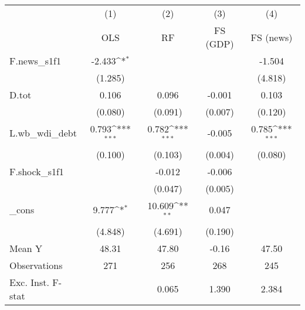 {
\def\sym#1{\ifmmode^{#1}\else\(^{#1}\)\fi}
\begin{tabular}{l*{4}{c}}
\toprule
            &\multicolumn{1}{c}{(1)}&\multicolumn{1}{c}{(2)}&\multicolumn{1}{c}{(3)}&\multicolumn{1}{c}{(4)}\\
            &\multicolumn{1}{c}{OLS}&\multicolumn{1}{c}{RF}&\multicolumn{1}{c}{FS (GDP)}&\multicolumn{1}{c}{FS (news)}\\
\midrule
F.news\_s1f1 &      -2.433\sym{*}  &                     &                     &      -1.504         \\
            &     (1.285)         &                     &                     &     (4.818)         \\
\addlinespace
D.tot       &       0.106         &       0.096         &      -0.001         &       0.103         \\
            &     (0.080)         &     (0.091)         &     (0.007)         &     (0.120)         \\
\addlinespace
L.wb\_wdi\_debt&       0.793\sym{***}&       0.782\sym{***}&      -0.005         &       0.785\sym{***}\\
            &     (0.100)         &     (0.103)         &     (0.004)         &     (0.080)         \\
\addlinespace
F.shock\_s1f1&                     &      -0.012         &      -0.006         &                     \\
            &                     &     (0.047)         &     (0.005)         &                     \\
\addlinespace
\_cons      &       9.777\sym{*}  &      10.609\sym{**} &       0.047         &                     \\
            &     (4.848)         &     (4.691)         &     (0.190)         &                     \\
\midrule
Mean Y      &       48.31         &       47.80         &       -0.16         &       47.50         \\
Observations&         271         &         256         &         268         &         245         \\
Exc. Inst. F-stat&                     &       0.065         &       1.390         &       2.384         \\
\bottomrule
\end{tabular}
}
